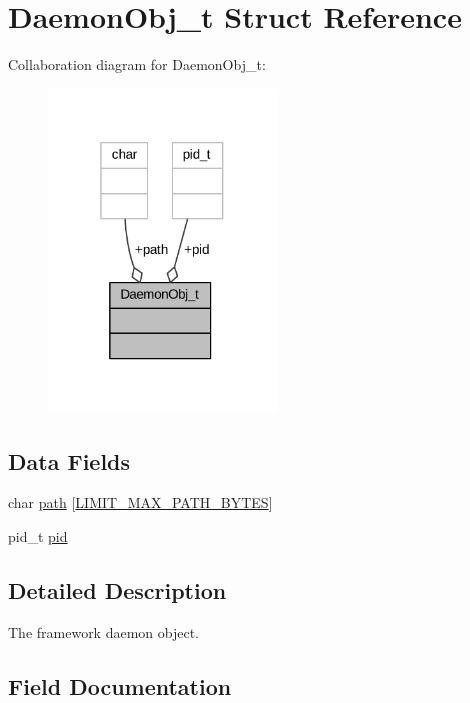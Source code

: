 \hypertarget{struct_daemon_obj__t}{}\section{Daemon\+Obj\+\_\+t Struct Reference}
\label{struct_daemon_obj__t}


Collaboration diagram for Daemon\+Obj\+\_\+t\+:
\nopagebreak
\begin{figure}[H]
\begin{center}
\leavevmode
\includegraphics[width=172pt]{struct_daemon_obj__t__coll__graph}
\end{center}
\end{figure}
\subsection*{Data Fields}
\begin{DoxyCompactItemize}
\item 
char \hyperlink{struct_daemon_obj__t_a45eaa9f5b2c13759358ef493e957f6cf}{path} \mbox{[}\hyperlink{limit_8h_accd19a6264ef965c02f113dc01610e14}{L\+I\+M\+I\+T\+\_\+\+M\+A\+X\+\_\+\+P\+A\+T\+H\+\_\+\+B\+Y\+T\+ES}\mbox{]}
\item 
pid\+\_\+t \hyperlink{struct_daemon_obj__t_aeef6d0a90c239a96921ff93fe013d065}{pid}
\end{DoxyCompactItemize}


\subsection{Detailed Description}
The framework daemon object. 

\subsection{Field Documentation}
